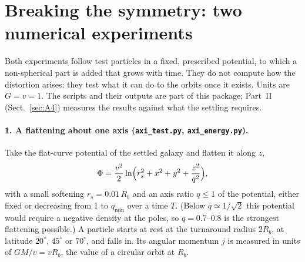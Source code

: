 \documentclass[11pt,a4paper]{article}
\begin{document}
\section{Breaking the symmetry: two numerical experiments}\label{sec:breaking}

Both experiments follow test particles in a fixed, prescribed potential, to which a
non-spherical part is added that grows with time. They do not compute how the
distortion arises; they test what it can do to the orbits once it exists. Units are
$G=v=1$. The scripts and their outputs are part of this package; Part~II
(Sect.~\ref{sec:A4}) measures the results against what the settling requires.

\paragraph{1. A flattening about one axis (\texttt{axi\_test.py},
\texttt{axi\_energy.py}).} Take the flat-curve potential of the settled galaxy and
flatten it along $z$,
\begin{equation}
  \Phi=\frac{v^2}{2}\ln\Bigl(r_s^2+x^2+y^2+\frac{z^2}{q^2}\Bigr),
\end{equation}
with a small softening $r_s=0.01\,R_b$ and an axis ratio $q\le1$ of the potential,
either fixed or decreasing from 1 to $q_{\min}$ over a time $T$. (Below
$q\simeq1/\sqrt2$ this potential would require a negative density at the poles, so
$q=0.7$--0.8 is the strongest flattening possible.) A particle starts at rest at the
turnaround radius $2R_b$, at latitude $20^\circ$, $45^\circ$ or $70^\circ$, and falls
in. Its angular momentum $j$ is measured in units of $GM/v=vR_b$, the value of a
circular orbit at $R_b$.
\end{document}
